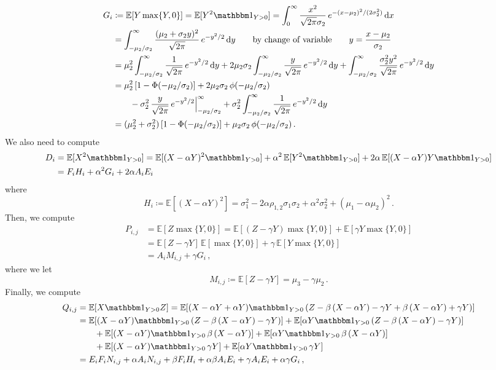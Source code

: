 \documentclass{custom}
\begin{document}
\begin{align*}
G_{i}
& \coloneqq\mathbb{E}[Y\max\{ Y,0\} ]=\mathbb{E}[Y^{2}\ind_{Y>0}]
=\int_{0}^{\infty}\frac{x^{2}}{\sqrt{2\pi}\sigma_{2}}\,e^{-(x-\mu_{2})^{2}/(2\sigma_{2}^{2})}\,\mathrm{d}x\\
 & =\int_{-\mu_{2}/\sigma_{2}}^{\infty}\frac{(\mu_{2}+\sigma_{2}y)^{2}}{\sqrt{2\pi}}\,e^{-y^{2}/2}\,\mathrm{d}y\qquad\text{by change of variable}\qquad y=\frac{x-\mu_{2}}{\sigma_{2}}\\
 & =\mu_{2}^{2}\int_{-\mu_{2}/\sigma_{2}}^{\infty}\frac{1}{\sqrt{2\pi}}\,e^{-y^{2}/2}\,\mathrm{d}y+2\mu_{2}\sigma_{2}\int_{-\mu_{2}/\sigma_{2}}^{\infty}\frac{y}{\sqrt{2\pi}}\,e^{-y^{2}/2}\,\mathrm{d}y+\int_{-\mu_{2}/\sigma_{2}}^{\infty}\frac{\sigma_{2}^{2}y^{2}}{\sqrt{2\pi}}\,e^{-y^{2}/2}\,\mathrm{d}y\\
 & =\mu_{2}^{2}\,[1-\Phi(-\mu_{2}/\sigma_{2})]+2\mu_{2}\sigma_{2}\,\phi(-\mu_{2}/\sigma_{2})\\
 &\qquad{} -\sigma_{2}^{2}\,\frac{y}{\sqrt{2\pi}}\,e^{-y^{2}/2}\Big|_{-\mu_{2}/\sigma_{2}}^{\infty}+\sigma_{2}^{2}\int_{-\mu_{2}/\sigma_{2}}^{\infty}\frac{1}{\sqrt{2\pi}}\,e^{-y^{2}/2}\,\mathrm{d}y\\
 & =(\mu_{2}^{2}+\sigma_{2}^{2})\,[1-\Phi(-\mu_{2}/\sigma_{2})]+\mu_{2}\sigma_{2}\,\phi(-\mu_{2}/\sigma_{2})\,.
\end{align*}
We also need to compute
\begin{align*}
D_{i} & =\mathbb{E}[X^{2}\ind_{Y>0}]=\mathbb{E}[(X-\alpha Y)^{2}\ind_{Y>0}]+\alpha^{2}\,\mathbb{E}[Y^{2}\ind_{Y>0}]+2\alpha\,\mathbb{E}[(X-\alpha Y)Y\ind_{Y>0}]\\
 &= F_i H_{i}+\alpha^{2}G_{i}+2\alpha A_i E_{i}
\end{align*}
where
\[
H_{i}\coloneqq\mathbb{E}[(X-\alpha Y)^{2}]=\sigma_{1}^{2}-2\alpha\rho_{1,2}\sigma_{1}\sigma_{2}+\alpha^{2}\sigma_{2}^{2}+(\mu_{1}-\alpha\mu_{2})^{2}\,.
\]
Then, we compute
\begin{align*}
P_{i,j} & =\mathbb{E}[Z\max\{ Y,0\}]
=\mathbb{E}[(Z-\gamma Y)\max\{ Y,0\} ]+\mathbb{E}[\gamma Y\max\{ Y,0\} ]\\
 & =\mathbb{E}[Z-\gamma Y]\,\mathbb{E}[\max\{ Y,0\} ]+\gamma\,\mathbb{E}[Y\max\{ Y,0\} ]\\
 & = A_i M_{i,j}+\gamma G_{i}\,,
\end{align*}
where we let 
\[
M_{i,j}\coloneqq\mathbb{E}[Z-\gamma Y]=\mu_{3}-\gamma\mu_{2}\,.
\]
Finally, we compute
\begin{align*}
Q_{i,j} & =\mathbb{E}[X\ind_{Y>0}Z]=\mathbb{E}[(X-\alpha Y+\alpha Y)\ind_{Y>0}\,(Z-\beta\,(X-\alpha Y)-\gamma Y+\beta\,(X-\alpha Y)+\gamma Y)]\\
 & =\mathbb{E}[(X-\alpha Y)\ind_{Y>0}\,(Z-\beta\,(X-\alpha Y)-\gamma Y)]+\mathbb{E}[\alpha Y\ind_{Y>0}\,(Z-\beta\,(X-\alpha Y)-\gamma Y)]\\
 & \qquad+\mathbb{E}[(X-\alpha Y)\ind_{Y>0}\,\beta\,(X-\alpha Y)]+\mathbb{E}[\alpha Y\ind_{Y>0}\,\beta\,(X-\alpha Y)]\\
 & \qquad+\mathbb{E}[(X-\alpha Y)\ind_{Y>0}\,\gamma Y]+\mathbb{E}[\alpha Y\ind_{Y>0}\,\gamma Y]\\
 & =E_{i}F_{i}N_{i,j}+\alpha A_{i}N_{i,j}+\beta F_{i} H_i +\alpha\beta A_{i}E_{i}+\gamma A_i E_{i}+\alpha\gamma G_{i}\,,
\end{align*}
\end{document}
